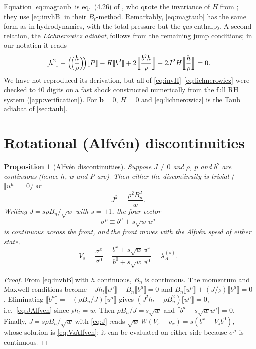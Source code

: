 \documentclass[11pt,a4paper,oneside,openany]{book}
\newcommand{\textcite}{\citet}
\newcommand{\parencite}{\citep}
\theoremstyle{definition}
\theoremstyle{plain}
\newtheorem{proposition}{Proposition}[chapter]
\theoremstyle{remark}
\newcommand{\jump}[1]{\llbracket #1\rrbracket}
\newcommand{\Ptot}{P}
\begin{document}
Equation \eqref{eq:magtaub} is eq.~(4.26) of \textcite{GiacomazzoRezzolla2006}, who quote
the invariance of $H$ from \textcite{Anile1989}; they use \eqref{eq:invhB} in their
$B_t$-method. Remarkably, \eqref{eq:magtaub} has the same form as in hydrodynamics, with
the total pressure but the \emph{gas} enthalpy. A second relation, the
\emph{Lichnerowicz adiabat}, follows from the remaining jump conditions; in our notation it
reads \parencite[eq.~4.27]{GiacomazzoRezzolla2006}
\begin{equation}\label{eq:lichnerowicz}
\jump{h^2}-\Bigl(\!\Bigl(\frac{h}{\rho}\Bigr)\!\Bigr)\jump{\Ptot}-H\jump{b^2}
+2\Bigl\llbracket\frac{b^2h}{\rho}\Bigr\rrbracket-2J^2H\Bigl\llbracket\frac{h}{\rho}\Bigr\rrbracket=0 .
\end{equation}
We have not reproduced its derivation, but all of
\eqref{eq:invH}--\eqref{eq:lichnerowicz} were checked to 40 digits on a fast shock
constructed numerically from the full RH system (\cref{app:verification}). For $\bm b=0$,
$H=0$ and \eqref{eq:lichnerowicz} is the Taub adiabat of \cref{sec:taub}.

\section{Rotational (Alfvén) discontinuities}\label{sec:rotational}

\begin{proposition}[Alfvén discontinuities]\label{prop:alfven}
Suppose $J\neq0$ and $\rho$, $p$ and $b^2$ are continuous (hence $h$, $w$ and $\Ptot$ are).
Then either the discontinuity is trivial ($\jump{u^\mu}=0$) or
\begin{equation}\label{eq:JAlfven}
J^2=\frac{\rho^2B_n^2}{w}.
\end{equation}
Writing $J=s\rho B_n/\sqrt w$ with $s=\pm1$, the four-vector
\begin{equation}\label{eq:sigma}
\sigma^\mu\equiv b^\mu+s\sqrt{w}\,u^\mu
\end{equation}
is continuous across the front, and the front moves with the Alfvén speed of either state,
\begin{equation}\label{eq:VsAlfven}
V_s=\frac{\sigma^x}{\sigma^0}=\frac{b^x+s\sqrt w\,u^x}{b^0+s\sqrt w\,u^0}=\lambda_A^{(s)} .
\end{equation}
\end{proposition}

\begin{proof}
From \eqref{eq:invhB} with $h$ continuous, $B_n$ is continuous. The momentum and Maxwell
conditions become $-Jh_t\jump{u^\mu}-B_n\jump{b^\mu}=0$ and
$B_n\jump{u^\mu}+(J/\rho)\jump{b^\mu}=0$. Eliminating $\jump{b^\mu}=-(\rho B_n/J)\jump{u^\mu}$
gives $(J^2h_t-\rho B_n^2)\jump{u^\mu}=0$, i.e.\ \eqref{eq:JAlfven} since $\rho h_t=w$.
Then $\rho B_n/J=s\sqrt w$ and $\jump{b^\mu+s\sqrt wu^\mu}=0$. Finally,
$J=s\rho B_n/\sqrt w$ with \eqref{eq:J} reads $\sqrt w\,W(V_s-v_x)=s(b^x-V_sb^0)$, whose
solution is \eqref{eq:VsAlfven}; it can be evaluated on either side because $\sigma^\mu$ is
continuous.
\end{proof}
\end{document}
